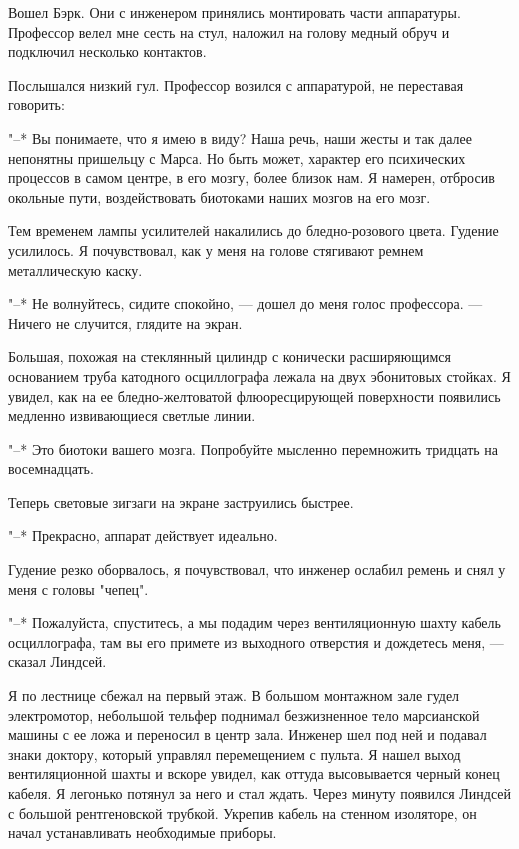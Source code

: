 Вошел Бэрк. Они с инженером  принялись  монтировать  части  аппаратуры.
Профессор велел мне сесть на  стул,  наложил  на  голову  медный  обруч  и
подключил несколько контактов.

Послышался низкий гул. Профессор возился с аппаратурой,  не  переставая
говорить:

"--* Вы понимаете, что я имею в виду? Наша речь, наши жесты  и  так  далее
непонятны пришельцу с Марса.  Но  быть  может,  характер  его  психических
процессов в самом центре, в  его  мозгу,  более  близок  нам.  Я  намерен,
отбросив окольные пути, воздействовать биотоками наших мозгов на его мозг.

Тем временем лампы  усилителей  накалились  до  бледно-розового  цвета.
Гудение усилилось. Я почувствовал, как у меня на голове  стягивают  ремнем
металлическую каску.

"--* Не волнуйтесь, сидите спокойно, --- дошел до меня голос  профессора.  ---
Ничего не случится, глядите на экран.

Большая,  похожая  на  стеклянный  цилиндр  с  конически  расширяющимся
основанием труба катодного осциллографа лежала на двух эбонитовых стойках.
Я  увидел,  как  на  ее  бледно-желтоватой   флюоресцирующей   поверхности
появились медленно извивающиеся светлые линии.

"--* Это биотоки вашего мозга. Попробуйте мысленно перемножить тридцать на
восемнадцать.

Теперь световые зигзаги на экране заструились быстрее.

"--* Прекрасно, аппарат действует идеально.

Гудение резко оборвалось, я почувствовал, что инженер ослабил ремень  и
снял у меня с головы "чепец".

"--* Пожалуйста, спуститесь,  а  мы  подадим  через  вентиляционную  шахту
кабель осциллографа, там вы его примете из выходного отверстия и дождетесь
меня, --- сказал Линдсей.

Я по лестнице сбежал на первый этаж. В  большом  монтажном  зале  гудел
электромотор, небольшой тельфер  поднимал  безжизненное  тело  марсианской
машины с ее ложа и переносил в центр зала. Инженер шел под ней  и  подавал
знаки доктору, который управлял  перемещением  с  пульта.  Я  нашел  выход
вентиляционной шахты и вскоре увидел, как оттуда высовывается черный конец
кабеля. Я легонько потянул за него и стал  ждать.  Через  минуту  появился
Линдсей  с  большой  рентгеновской  трубкой.  Укрепив  кабель  на  стенном
изоляторе, он начал устанавливать необходимые приборы.

